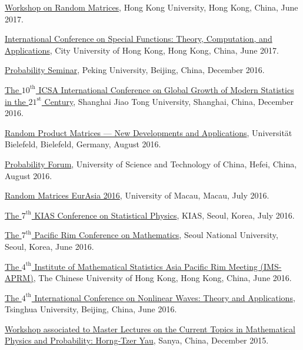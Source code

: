 \documentclass[12pt,a4paper]{article}
\newenvironment{item_list}{
 \begin{list}{}{
   \setlength{\leftmargin}{1.5em}
   \setlength{\itemsep}{0.25em}
   \setlength{\parskip}{0pt}
   \setlength{\parsep}{0.25em}
 }
}{
 \end{list}
}
\begin{document}
\begin{item_list}
\item
  \href{http://hkumath.hku.hk/~imr/records1617/Workshop%20on%20Random%20Matrices_2017Jun16.pdf}{Workshop on Random Matrices}, Hong Kong University, Hong Kong, China, June 2017.
\item 
  \href{http://www6.cityu.edu.hk/rcms/icsf2017/index.htm}{International Conference on Special Functions: Theory, Computation, and Applications}, City University of Hong Kong, Hong Kong, China, June 2017.
\item
  \href{http://www.math.pku.edu.cn/teachers/liuyong/seminar/wangdong2016.pdf}{Probability Seminar}, Peking University, Beijing, China, December 2016.
\item
  \href{http://www.math.sjtu.edu.cn/conference/2016icsa/}{The $10^{\text{th}}$ ICSA International Conference on Global Growth of Modern Statistics in the $21^{\text{st}}$ Century}, Shanghai Jiao Tong University, Shanghai, China, December 2016.
\item
  \href{https://www2.physik.uni-bielefeld.de/rpm_2016.html}{Random Product Matrices --- New Developments and Applications}, Universit\"{a}t Bielefeld, Bielefeld, Germany, August 2016.
\item
  \href{http://home.ustc.edu.cn/~shanamy3/index.html}{Probability Forum}, University of Science and Technology of China, Hefei, China, August 2016.
\item
  \href{http://www.fst.umac.mo/conference/RandomMatricesEurAsia2016/Abstracts/Blower_abstract.pdf}{Random Matrices EurAsia 2016}, University of Macau, Macau, July 2016.
\item 
  \href{http://home.kias.re.kr/psec/nspcs16/}{The $7^{\text{th}}$ KIAS Conference on Statistical Physics}, KIAS, Seoul, Korea, July 2016.
\item
  \href{http://prcm.math.snu.ac.kr/}{The $7^{\text{th}}$ Pacific Rim Conference on Mathematics}, Seoul National University, Seoul, Korea, June 2016.
\item
  \href{http://ims-aprm2016.sta.cuhk.edu.hk/}{The $4^{\text{th}}$ Institute of Mathematical Statistics Asia Pacific Rim Meeting (IMS-APRM)}, The Chinese University of Hong Kong, Hong Kong, China, June 2016.
\item
  \href{http://icnwta4.csp.escience.cn/dct/page/1}{The $4^{\text{th}}$ International Conference on Nonlinear Waves: Theory and Applications}, Tsinghua University, Beijing, China, June 2016.
\item
  \href{http://ymsc.tsinghua.edu.cn/sanya/2016/MHTY2016/synopsis_and_organizers.aspx}{Workshop associated to Master Lectures on the Current Topics in Mathematical Physics and Probability: Horng-Tzer Yau}, Sanya, China, December 2015.

\end{item_list}
\end{document}
